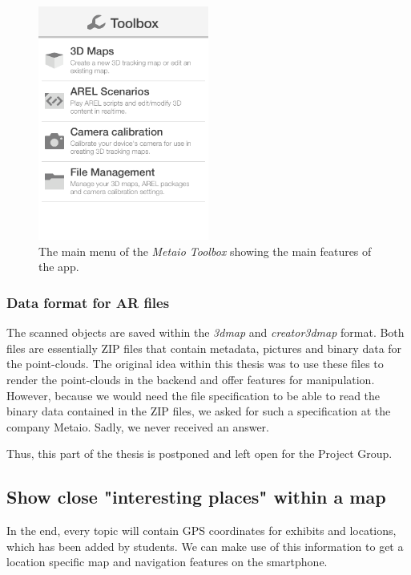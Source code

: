 \begin{figure}[th]
	\centerline{\includegraphics[width=0.5\textwidth]{gfx/toolbox.png}}
	\caption{The main menu of the \emph{Metaio Toolbox} showing the main features of the app.}
	\label{MetToolbox}
\end{figure}	

\subsubsection{Data format for \ac{AR} files}
The scanned objects are saved within the \emph{3dmap} and \emph{creator3dmap} format. Both files are essentially ZIP files that contain metadata, pictures and binary data for the point-clouds. The original idea within this thesis was to use these files to render the point-clouds in the backend and offer features for manipulation. However, because we would need the file specification to be able to read the binary data contained in the ZIP files, we asked for such a specification at the company Metaio. Sadly, we never received an answer. 

Thus, this part of the thesis is postponed and left open for the Project Group.

\subsection{Show close "interesting places" within a map} 
In the end, every topic will contain \ac{GPS} coordinates for exhibits and locations, which has been added by students. We can make use of this information to get a location specific map and navigation features on the smartphone. 


